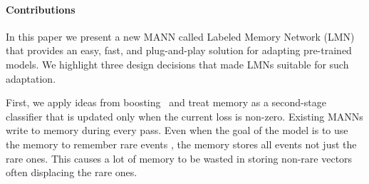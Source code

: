 \documentclass[letterpaper]{article} %
\def\shiv#1{\todo [color=orange]{Shiv: #1}}
\def\sunita#1{\todo [color=purple]{Sunita: #1}}
\begin{document}
\paragraph{Contributions}
In this paper we present a new MANN called Labeled Memory Network (LMN) that provides an easy, fast, and plug-and-play solution for adapting pre-trained models.  We highlight three design decisions that made LMNs suitable for such adaptation.

%




First, we apply ideas from boosting~\cite{Schapire:1999adaboost} and treat memory as a second-stage classifier that is updated only when the current loss is non-zero. Existing MANNs write to memory during every pass.  Even when the goal of the model is to use the memory to remember rare events \cite{kaiser2017}, the memory stores all events not just the rare ones. This causes a lot of memory to be wasted in storing non-rare vectors often displacing the rare ones.
\end{document}
